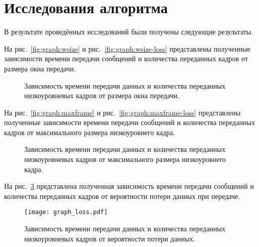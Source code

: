 \documentclass[a4paper,10pt]{article}
\begin{document}
\section{Исследования алгоритма}
В результате проведённых исследований были получены следующие результаты.

На рис.~\ref{fig:graph:wsize} и рис.~\ref{fig:graph:wsize-loss}
представлены полученные зависимости времени передачи сообщений 
и количества переданных кадров от размера окна передачи.
\begin{figure}
  \centering
  \quad
  \caption{Зависимость времени передачи данных и количества переданных низкоуровневых кадров от размера окна передачи.}
  \label{fig:graph:wsize-all}
\end{figure}

На рис.~\ref{fig:graph:maxframe} и рис.~\ref{fig:graph:maxframe-loss}
представлены полученные зависимости времени передачи сообщений 
и количества переданных кадров от максимального размера низкоуровнего кадра.
\begin{figure}
  \centering
  \quad
  \caption{Зависимость времени передачи данных и количества переданных низкоуровневых кадров 
  от максимального размера низкоуровнего кадра.}
  \label{fig:graph:maxframe-all}
\end{figure}

На рис.~\ref{fig:graph:loss}
представлена полученная зависимость времени передачи сообщений 
и количества переданных кадров от вероятности потери данных при передаче.
\begin{figure}
  \centering
  \texttt{[image: graph\_loss.pdf]}
  \caption{Зависимость времени передачи данных и количества переданных низкоуровневых кадров 
  от вероятности потери данных.}
  \label{fig:graph:loss}
\end{figure}

\pagebreak
\end{document}
